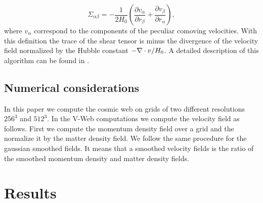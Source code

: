 \documentclass[usenatbib]{mn2e}
\begin{document}
\begin{equation}
\Sigma_{\alpha\beta} = -\frac{1}{2H_{0}}\left(\frac{\partial
  v_{\alpha}}{\partial r_{\beta}}+ \frac{\partial v_{\beta}}{\partial
  r_{\alpha}}\right), 
\end{equation}
%
where $v_{\alpha}$ correspond to the components of the peculiar
comoving velocities. With this definition the trace of the shear
tensor is minus the divergence of the velocity field normalized by the
Hubble constant $-\nabla\cdot {\bf}v /H_{0}$. A detailed description
of this algorithm can be found in \citep{Vweb}.




\subsection{Numerical considerations}

In this paper we compute the cosmic web on grids of two different
resolutions $256^3$ and $512^3$. In the V-Web computations we compute
the velocity field as follows. First we compute the momentum density field
over a grid and the normalize it by the matter density field. We follow the
same procedure for the gaussian smoothed fields. It means that a
smoothed velocity fields is the ratio of the smoothed momentum density
and matter density fields.


\section{Results}
\label{sec:results}
\end{document}

